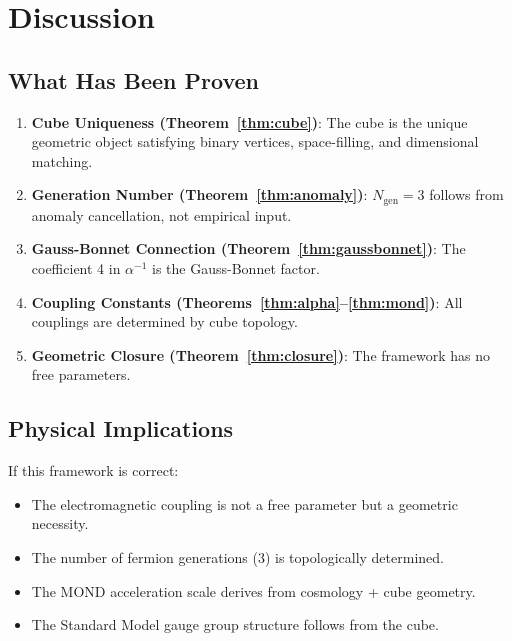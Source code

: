 \documentclass[twocolumn,showpacs,preprintnumbers,amsmath,amssymb,prd]{revtex4-2}
\begin{document}
\section{Discussion}

\subsection{What Has Been Proven}

\begin{enumerate}
\item \textbf{Cube Uniqueness (Theorem~\ref{thm:cube})}: The cube is the unique geometric object satisfying binary vertices, space-filling, and dimensional matching.

\item \textbf{Generation Number (Theorem~\ref{thm:anomaly})}: $N_{\text{gen}} = 3$ follows from anomaly cancellation, not empirical input.

\item \textbf{Gauss-Bonnet Connection (Theorem~\ref{thm:gaussbonnet})}: The coefficient 4 in $\alpha^{-1}$ is the Gauss-Bonnet factor.

\item \textbf{Coupling Constants (Theorems~\ref{thm:alpha}--\ref{thm:mond})}: All couplings are determined by cube topology.

\item \textbf{Geometric Closure (Theorem~\ref{thm:closure})}: The framework has no free parameters.
\end{enumerate}

\subsection{Physical Implications}

If this framework is correct:
\begin{itemize}
\item The electromagnetic coupling is not a free parameter but a geometric necessity.
\item The number of fermion generations (3) is topologically determined.
\item The MOND acceleration scale derives from cosmology + cube geometry.
\item The Standard Model gauge group structure follows from the cube.
\end{itemize}
\end{document}
